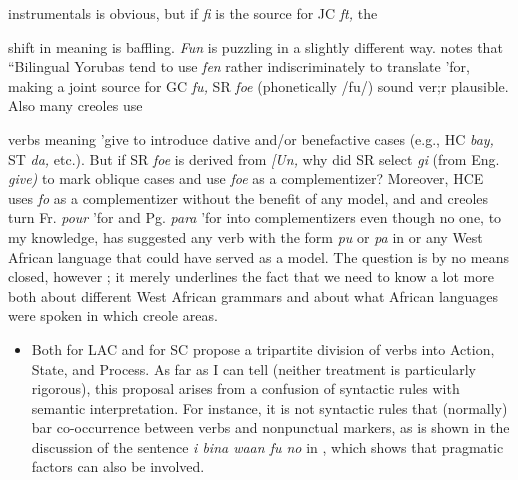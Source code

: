 \begin{itemize}
\begin{itemize}
\begin{itemize}
\begin{itemize}
instrumentals is obvious, but if  \textit{fi} is the source for JC \textit{ft,} the

shift in meaning is baffling. \textit{Fun} is puzzling in a slightly different way. \citet{Rowlands1969} notes that ``Bilingual Yorubas tend to use \textit{fen} rather indiscriminately to translate 'for, making a joint source for GC \textit{fu,} SR \textit{foe }(phonetically /fu/) sound ver;r plausible. Also many creoles use


verbs meaning 'give to introduce dative and/or benefactive cases (e.g., HC \textit{bay,} ST \textit{da,} etc.). But if SR \textit{foe} is derived from  \textit{[Un,} why did SR select \textit{gi} (from Eng. \textit{give}\textit{)} to mark oblique cases and use \textit{foe} as a complementizer? Moreover, HCE uses \textit{fo} as a complementizer without the benefit of any  model, and  and  creoles turn Fr. \textit{pour} 'for and Pg. \textit{para} 'for into complementizers even though no one, to my knowledge, has suggested any verb with the form \textit{pu} or \textit{pa} in  or any West African language that could have served as a model. The question is by no means closed, however ; it merely underlines the fact that we need to know a lot more both about different West African grammars and about what African lan\-guages were spoken in which creole areas.

\begin{itemize}
\item Both \citet{Christie1976} for LAC and \citet{Corne1981} for SC propose a tripartite division of verbs into Action, State, and Process. As far as I can tell (neither treatment is particularly rigorous), this proposal arises from a confusion of syntactic rules with semantic interpretation. For instance, it is not syntactic rules that (normally) bar co-occurrence between  verbs and nonpunctual markers, as is shown in the discussion of the sentence \textit{i bina waan fu no} in \citet[38]{Bickerton1975}, which shows that pragmatic factors can also be involved.


\end{itemize}
\end{itemize}
\end{itemize}
\end{itemize}
\end{itemize}
